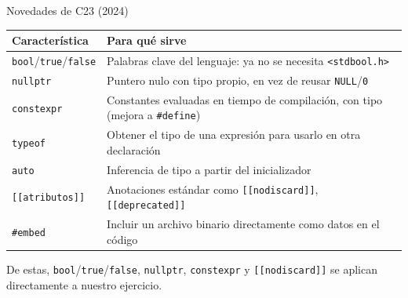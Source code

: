 \documentclass[aspectratio=169]{beamer}
\begin{document}
\begin{frame}{Novedades de C23 (2024)}
    \small
    \begin{table}
        \begin{tabular}{p{4.3cm}p{7.5cm}}
            \toprule
            \textbf{Característica} & \textbf{Para qué sirve} \\
            \midrule
            \texttt{bool}/\texttt{true}/\texttt{false} & Palabras clave del lenguaje: ya no se necesita \texttt{<stdbool.h>} \\
            \texttt{nullptr} & Puntero nulo con tipo propio, en vez de reusar \texttt{NULL}/\texttt{0} \\
            \texttt{constexpr} & Constantes evaluadas en tiempo de compilación, con tipo (mejora a \texttt{\#define}) \\
            \texttt{typeof} & Obtener el tipo de una expresión para usarlo en otra declaración \\
            \texttt{auto} & Inferencia de tipo a partir del inicializador \\
            \texttt{[[atributos]]} & Anotaciones estándar como \texttt{[[nodiscard]]}, \texttt{[[deprecated]]} \\
            \texttt{\#embed} & Incluir un archivo binario directamente como datos en el código \\
            \bottomrule
        \end{tabular}
    \end{table}

    \vspace{0.3em}
    \small De estas, \texttt{bool}/\texttt{true}/\texttt{false},
    \texttt{nullptr}, \texttt{constexpr} y \texttt{[[nodiscard]]} se aplican
    directamente a nuestro ejercicio.
\end{frame}
\end{document}
